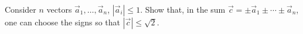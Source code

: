 Consider $n$ vectors $\vec a_1, \ldots, \vec a_n$, $|\vec a_i| \leq 1$. Show that, in the sum $\vec c = \pm\vec a_1 \pm \cdots \pm \vec a_n$, one can choose the signs so that $|\vec c| \leq \sqrt{2}$.
